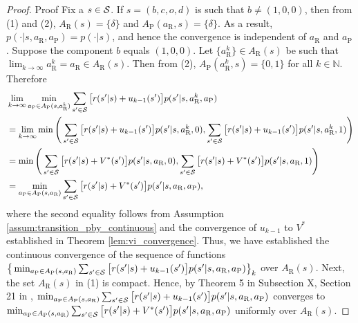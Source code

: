 \documentclass[aoas]{imsart}
\theoremstyle{plain}
\theoremstyle{definition}
\begin{document}
\begin{proof}{Proof}
           Fix a $s \in {\cal S}$. If $s = (b,c,o,d)$ is such that $b \neq (1,0,0)$, then from (1) and (2),  $A_\text{R}(s) = \{\delta\}$ and $ A_\text{P}(a_\text{R},s) = \{\delta\}$. As a result, $p(\cdot|s,a_\text{R},a_\text{P}) = p(\cdot|s)$, and hence the convergence is independent of $a_\text{R}$ and $a_\text{P}$. Suppose the component $b$ equals $(1,0,0)$. Let $\{a_\text{R}^k\} \in A_\text{R}(s)$ be such that $\lim_{k \to \infty}a_\text{R}^k = a_\text{R} \in A_\text{R}(s)$. Then from  (2), $A_\text{P}(a_\text{R}^k,s) = \{0,1\}$ for all $k \in \mathbb{N}$. Therefore
           \begingroup
           \allowdisplaybreaks
           \begin{align*}
           &\lim_{k \to \infty}\min_{a_\text{P} \in A_\text{P}(s,a_\text{R}^k)}\sum_{s' \in {\cal S}}\big[r(s'|s) + u_{k-1}(s')\big]p(s'|s,a_\text{R}^k,a_\text{P}) \\
           &= \lim_{k \to \infty}\min\Bigg(\sum_{s' \in {\cal S}}\big[r(s'|s) + u_{k-1}(s')\big]p(s'|s,a_\text{R}^k,0),\sum_{s' \in {\cal S}}\big[r(s'|s) + u_{k-1}(s')\big]p(s'|s,a_\text{R}^k,1)\Bigg)\\
           &= \min\Bigg(\sum_{s' \in {\cal S}}\big[r(s'|s) + V^*(s')\big]p(s'|s,a_\text{R},0),\sum_{s' \in {\cal S}}\big[r(s'|s) + V^*(s')\big]p(s'|s,a_\text{R},1)\Bigg)\\
           &= \min_{a_\text{P} \in A_\text{P}(s,a_\text{R})}\sum_{s' \in {\cal S}}\big[r(s'|s) + V^*(s')\big]p(s'|s,a_\text{R},a_\text{P}),
           \end{align*}
           \endgroup
           where the second equality follows from Assumption \ref{assum:transition_pby_continuous} and the convergence of $u_{k-1}$ to $V^*$ established in Theorem \ref{lem:vi_convergence}. Thus, we have established the continuous convergence of the sequence of functions $\big\{\min_{a_\text{P} \in A_\text{P}(s,a_\text{R})}\sum_{s' \in {\cal S}}\big[r(s'|s) + u_{k-1}(s')\big]p(s'|s,a_\text{R},a_\text{P})\big\}_k$ over $A_\text{R}(s)$. Next, the set $A_\text{R}(s)$ in (1)  is compact. Hence, by Theorem 5 in Subsection X, Section 21 in  \cite{kuratowski_topology_2014}, $\min_{a_\text{P} \in A_\text{P}(s,a_\text{R})}\sum_{s' \in {\cal S}}\big[r(s'|s) + u_{k-1}(s')\big]p(s'|s,a_\text{R},a_\text{P})$ converges to $\min_{a_\text{P} \in A_\text{P}(s,a_\text{R})}\sum_{s' \in {\cal S}}\big[r(s'|s) + V^*(s')\big]p(s'|s,a_\text{R},a_\text{P})$ uniformly over $A_\text{R}(s)$.
    

\end{proof}
\end{document}
